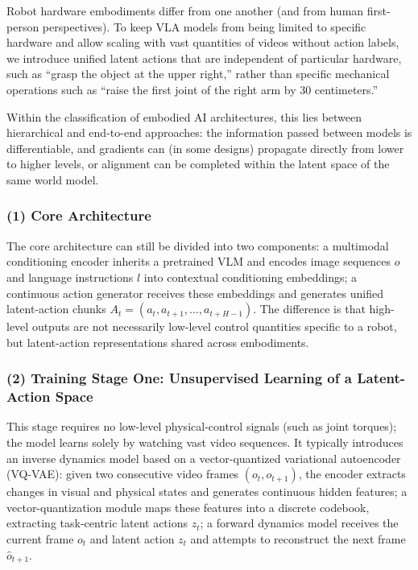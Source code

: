 Robot hardware embodiments differ from one another (and from human first-person perspectives). To keep VLA models from being limited to specific hardware and allow scaling with vast quantities of videos without action labels, we introduce unified latent actions that are independent of particular hardware, such as ``grasp the object at the upper right,'' rather than specific mechanical operations such as ``raise the first joint of the right arm by 30 centimeters.''

Within the classification of embodied AI architectures, this lies between hierarchical and end-to-end approaches: the information passed between models is differentiable, and gradients can (in some designs) propagate directly from lower to higher levels, or alignment can be completed within the latent space of the same world model.

\hypertarget{core-architecture-1}{%
\subsubsection{(1) Core Architecture}\label{core-architecture-1}}

The core architecture can still be divided into two components: a multimodal conditioning encoder inherits a pretrained VLM and encodes image sequences \(o\) and language instructions \(l\) into contextual conditioning embeddings; a continuous action generator receives these embeddings and generates unified latent-action chunks \(A_t=(a_t,a_{t+1},\ldots,a_{t+H-1})\). The difference is that high-level outputs are not necessarily low-level control quantities specific to a robot, but latent-action representations shared across embodiments.

\hypertarget{training-stage-one-unsupervised-learning-of-a-latent-action-space}{%
\subsubsection{(2) Training Stage One: Unsupervised Learning of a Latent-Action Space}\label{training-stage-one-unsupervised-learning-of-a-latent-action-space}}

This stage requires no low-level physical-control signals (such as joint torques); the model learns solely by watching vast video sequences. It typically introduces an inverse dynamics model based on a vector-quantized variational autoencoder (VQ-VAE): given two consecutive video frames \((o_t,o_{t+1})\), the encoder extracts changes in visual and physical states and generates continuous hidden features; a vector-quantization module maps these features into a discrete codebook, extracting task-centric latent actions \(z_t\); a forward dynamics model receives the current frame \(o_t\) and latent action \(z_t\) and attempts to reconstruct the next frame \(\hat{o}_{t+1}\).

